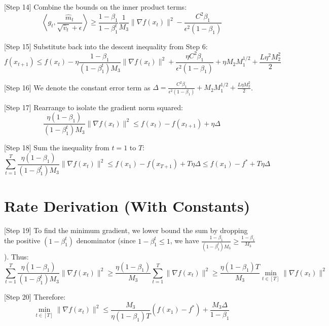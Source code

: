 \documentclass{article}
\begin{document}
[Step 14] Combine the bounds on the inner product terms:
$$
\left\langle g_t, \frac{\hat{m}_t}{\sqrt{\hat{v}_t} + \epsilon} \right\rangle \geq \frac{1-\beta_1}{1-\beta_1^t} \frac{1}{M_3} \|\nabla f(x_t)\|^2 - \frac{C^2 \beta_1}{\epsilon^2 (1-\beta_1)}
$$

[Step 15] Substitute back into the descent inequality from Step 6:
$$
f(x_{t+1}) \leq f(x_t) - \eta \frac{1-\beta_1}{(1-\beta_1^t) M_3} \|\nabla f(x_t)\|^2 + \frac{\eta C^2 \beta_1}{\epsilon^2 (1-\beta_1)} + \eta M_2 M_1^{1/2} + \frac{L \eta^2 M_2^2}{2}
$$

[Step 16] We denote the constant error term as $\Delta = \frac{C^2 \beta_1}{\epsilon^2 (1-\beta_1)} + M_2 M_1^{1/2} + \frac{L \eta M_2^2}{2}$.

[Step 17] Rearrange to isolate the gradient norm squared:
$$
\frac{\eta(1-\beta_1)}{(1-\beta_1^t) M_3} \|\nabla f(x_t)\|^2 \leq f(x_t) - f(x_{t+1}) + \eta \Delta
$$

[Step 18] Sum the inequality from $t=1$ to $T$:
$$
\sum_{t=1}^T \frac{\eta(1-\beta_1)}{(1-\beta_1^t) M_3} \|\nabla f(x_t)\|^2 \leq f(x_1) - f(x_{T+1}) + T \eta \Delta \leq f(x_1) - f^* + T \eta \Delta
$$

\section*{Rate Derivation (With Constants)}
[Step 19] To find the minimum gradient, we lower bound the sum by dropping the positive $(1-\beta_1^t)$ denominator (since $1-\beta_1^t \leq 1$, we have $\frac{1-\beta_1}{(1-\beta_1^t) M_3} \geq \frac{1-\beta_1}{M_3}$). Thus:
$$
\sum_{t=1}^T \frac{\eta(1-\beta_1)}{(1-\beta_1^t) M_3} \|\nabla f(x_t)\|^2 \geq \frac{\eta(1-\beta_1)}{M_3} \sum_{t=1}^T \|\nabla f(x_t)\|^2 \geq \frac{\eta(1-\beta_1) T}{M_3} \min_{t \in [T]} \|\nabla f(x_t)\|^2
$$

[Step 20] Therefore:
$$
\min_{t \in [T]} \|\nabla f(x_t)\|^2 \leq \frac{M_3}{\eta(1-\beta_1) T} (f(x_1) - f^*) + \frac{M_3 \Delta}{1-\beta_1}
$$
\end{document}
